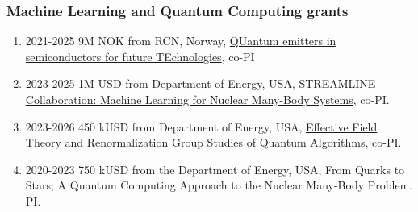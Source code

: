 \documentclass{beamer}
\begin{document}
\begin{frame}
\frametitle{Machine Learning and Quantum Computing grants}

\begin{enumerate}
\item 2021-2025 9M NOK from RCN, Norway, \href{{https://www.mn.uio.no/smn/english/research/projects/physics/325573-qute/index.html}}{QUantum emitters in semiconductors for future TEchnologies}, co-PI

\item 2023-2025 1M USD from Department of Energy, USA, \href{{https://frib.msu.edu/news/2023/machine-learning.html#:~:text=For%

\item 2023-2026 450 kUSD from Department of Energy, USA, \href{{https://frib.msu.edu/news/2023/quantum-computing.html}}{Effective Field Theory and Renormalization Group Studies of Quantum Algorithms}, co-PI.

\item 2020-2023 750 kUSD from the Department of Energy, USA, From Quarks to Stars; A Quantum Computing Approach to the Nuclear Many-Body Problem. PI.
\end{enumerate}

\noindent
\end{frame}
\end{document}
